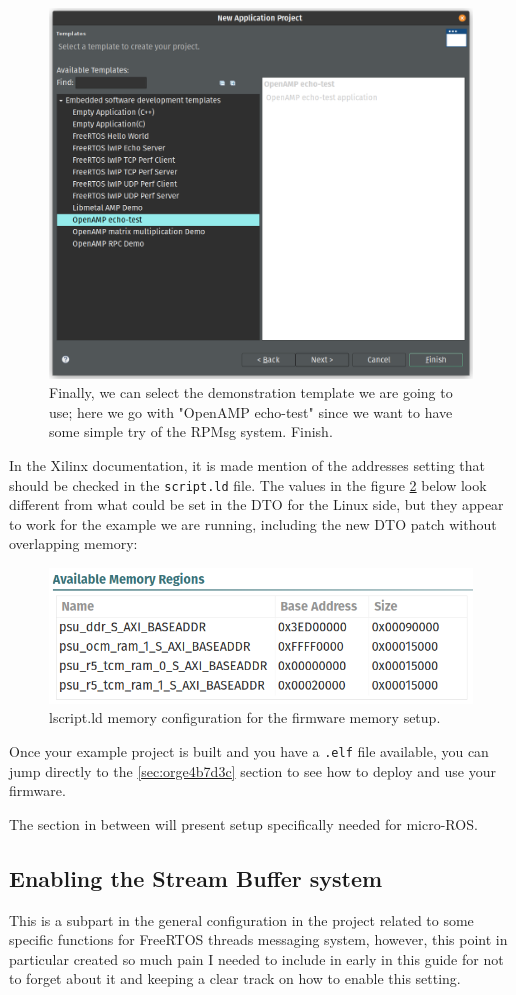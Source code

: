\documentclass[10pt]{article}
\begin{document}
\begin{figure}[htbp]
\centering
\includegraphics[width=.6\textwidth]{./img/vitis_new/project7.png}
\caption{\label{fig:org34fe582}Finally, we can select the demonstration template we are going to use; here we go with "OpenAMP echo-test" since we want to have some simple try of the RPMsg system. Finish.}
\end{figure}

\pagebreak
In the Xilinx documentation, it is made mention of the addresses setting that should be checked in the \texttt{script.ld} file.
The values in the figure \ref{fig:orgaac5c6d} below look different from what could be set in the DTO for the Linux side, but they appear to
work for the example we are running, including the new DTO patch without overlapping memory:


\begin{figure}[htbp]
\centering
\includegraphics[width=.6\textwidth]{./img/vitis_new/project_mem.png}
\caption{\label{fig:orgaac5c6d}lscript.ld memory configuration for the firmware memory setup.}
\end{figure}


Once your example project is built and you have a \texttt{.elf} file available, you can
jump directly to the \ref{sec:orge4b7d3c} section to see how to deploy and use your firmware.

The section in between will present setup specifically needed for micro-ROS.

\subsection{Enabling the Stream Buffer system}
\label{sec:orgc130e42}
This is a subpart in the general configuration in the project related to some specific
functions for FreeRTOS threads messaging system, however, this point in particular
created so much pain I needed to include in early in this guide for not to forget about it
and keeping a clear track on how to enable this setting.
\end{document}
